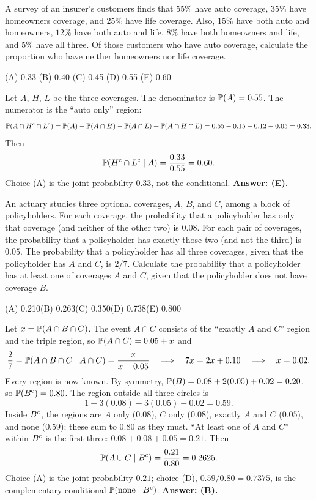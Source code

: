\begin{example}
A survey of an insurer's customers finds that $55\%$ have auto coverage, $35\%$
have homeowners coverage, and $25\%$ have life coverage. Also, $15\%$ have both
auto and homeowners, $12\%$ have both auto and life, $8\%$ have both homeowners
and life, and $5\%$ have all three. Of those customers who have auto coverage,
calculate the proportion who have neither homeowners nor life coverage.

\medskip
(A) 0.33 \quad (B) 0.40 \quad (C) 0.45 \quad (D) 0.55 \quad (E) 0.60
\end{example}

\begin{solution}
Let $A$, $H$, $L$ be the three coverages. The denominator is $\mathbb{P}(A) = 0.55$.
The numerator is the ``auto only'' region:
\[
\mathbb{P}(A \cap H^{\mathrm{c}} \cap L^{\mathrm{c}}) = \mathbb{P}(A) - \mathbb{P}(A\cap H) - \mathbb{P}(A \cap L) + \mathbb{P}(A\cap H \cap L)
= 0.55 - 0.15 - 0.12 + 0.05 = 0.33 .
\]
Then
\[
\mathbb{P}(H^{\mathrm{c}} \cap L^{\mathrm{c}} \mid A) = \frac{0.33}{0.55} = 0.60 .
\]
Choice (A) is the joint probability $0.33$, not the conditional.
\textbf{Answer: (E).}
\end{solution}

\begin{example}
An actuary studies three optional coverages, $A$, $B$, and $C$, among a block
of policyholders. For each coverage, the probability that a policyholder has
only that coverage (and neither of the other two) is $0.08$. For each pair of
coverages, the probability that a policyholder has exactly those two (and not
the third) is $0.05$. The probability that a policyholder has all three
coverages, given that the policyholder has $A$ and $C$, is $2/7$. Calculate
the probability that a policyholder has at least one of coverages $A$ and $C$,
given that the policyholder does not have coverage $B$.

\medskip
(A) 0.210\qquad (B) 0.263\qquad (C) 0.350\qquad (D) 0.738\qquad (E) 0.800
\end{example}

\begin{solution}
Let $x = \mathbb{P}(A \cap B \cap C)$. The event $A \cap C$ consists of the
``exactly $A$ and $C$'' region and the triple region, so
$\mathbb{P}(A \cap C) = 0.05 + x$ and
\[
\frac{2}{7} = \mathbb{P}(A \cap B \cap C \mid A \cap C) = \frac{x}{x + 0.05}
\quad\Longrightarrow\quad 7x = 2x + 0.10 \quad\Longrightarrow\quad x = 0.02 .
\]
Every region is now known. By symmetry,
$\mathbb{P}(B) = 0.08 + 2(0.05) + 0.02 = 0.20$, so $\mathbb{P}(B^{\mathrm{c}}) = 0.80$.
The region outside all three circles is
\[
1 - 3(0.08) - 3(0.05) - 0.02 = 0.59 .
\]
Inside $B^{\mathrm{c}}$, the regions are $A$ only ($0.08$), $C$ only ($0.08$),
exactly $A$ and $C$ ($0.05$), and none ($0.59$); these sum to $0.80$ as
they must. ``At least one of $A$ and $C$'' within $B^{\mathrm{c}}$ is the first three:
$0.08 + 0.08 + 0.05 = 0.21$. Then
\[
\mathbb{P}(A \cup C \mid B^{\mathrm{c}}) = \frac{0.21}{0.80} = 0.2625 .
\]
Choice (A) is the joint probability $0.21$; choice (D), $0.59/0.80 = 0.7375$,
is the complementary conditional $\mathbb{P}(\text{none} \mid B^{\mathrm{c}})$.
\textbf{Answer: (B).}
\end{solution}

